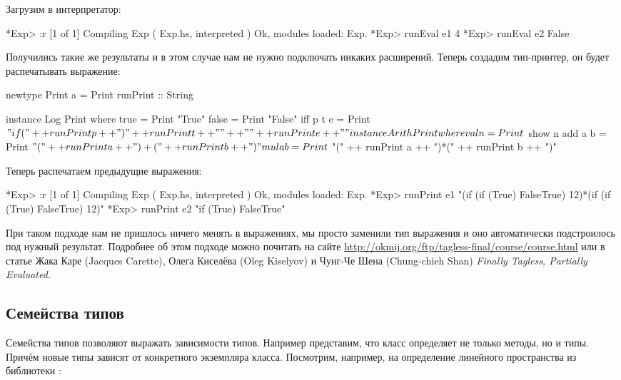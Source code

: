 Загрузим в интерпретатор: 

\begin{code}
*Exp> :r
[1 of 1] Compiling Exp              ( Exp.hs, interpreted )
Ok, modules loaded: Exp.
*Exp> runEval e1
4
*Exp> runEval e2
False
\end{code}

Получились такие же результаты и в этом случае нам 
не нужно подключать никаких расширений. Теперь создадим
тип-принтер, он будет распечатывать выражение:

\begin{code}
newtype Print a = Print { runPrint :: String }

instance Log Print where
    true    = Print "True" 
    false   = Print "False"
    iff p t e = Print $ "if (" ++ runPrint p ++ ") {" 
            ++ runPrint t ++ "}"
            ++ "{" ++ runPrint e ++ "}"

instance Arith Print where
    val n   = Print $ show n
    add a b = Print $ "(" ++ runPrint a ++ ")+(" ++ runPrint b ++ ")"
    mul a b = Print $ "(" ++ runPrint a ++ ")*(" ++ runPrint b ++ ")"
\end{code}

Теперь распечатаем предыдущие выражения:


\begin{code}
*Exp> :r
[1 of 1] Compiling Exp              ( Exp.hs, interpreted )
Ok, modules loaded: Exp.
*Exp> runPrint e1
"(if (if (True) {False}{True}) {1}{2})*(if (if (True) {False}{True}) {1}{2})"
*Exp> runPrint e2
"if (True) {False}{True}"
\end{code}

При таком подходе нам не пришлось ничего менять в выражениях,
мы просто заменили тип выражения и оно автоматически подстроилось под
нужный результат. Подробнее об этом подходе можно почитать 
на сайте \url{http://okmij.org/ftp/tagless-final/course/course.html}
или в статье Жака Каре (Jacques Carette), Олега Киселёва (Oleg Kiselyov) и 
Чунг-Че Шена (Chung-chieh Shan) \emph{Finally Tagless, Partially Evaluated}.

\subsection{Семейства типов}

Семейства типов позволяют выражать зависимости типов.
Например представим, что класс определяет не только 
методы, но и типы. Причём новые типы зависят от конкретного
экземпляра класса. Посмотрим, например, на определение 
линейного пространства из библиотеки :

